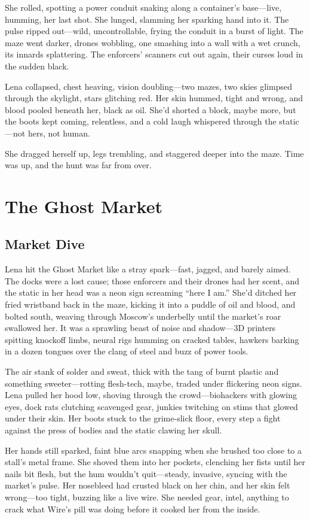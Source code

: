 \documentclass[12pt]{book}
\begin{document}
She rolled, spotting a power conduit snaking along a container’s base---live, humming, her last shot. She lunged, slamming her sparking hand into it. The pulse ripped out---wild, uncontrollable, frying the conduit in a burst of light. The maze went darker, drones wobbling, one smashing into a wall with a wet crunch, its innards splattering. The enforcers’ scanners cut out again, their curses loud in the sudden black.

Lena collapsed, chest heaving, vision doubling---two mazes, two skies glimpsed through the skylight, stars glitching red. Her skin hummed, tight and wrong, and blood pooled beneath her, black as oil. She’d shorted a block, maybe more, but the boots kept coming, relentless, and a cold laugh whispered through the static---not hers, not human.

She dragged herself up, legs trembling, and staggered deeper into the maze. Time was up, and the hunt was far from over.

\chapter{The Ghost Market}
\section{Market Dive}

Lena hit the Ghost Market like a stray spark---fast, jagged, and barely aimed. The docks were a lost cause; those enforcers and their drones had her scent, and the static in her head was a neon sign screaming ``here I am.'' She’d ditched her fried wristband back in the maze, kicking it into a puddle of oil and blood, and bolted south, weaving through Moscow’s underbelly until the market’s roar swallowed her. It was a sprawling beast of noise and shadow---3D printers spitting knockoff limbs, neural rigs humming on cracked tables, hawkers barking in a dozen tongues over the clang of steel and buzz of power tools.

The air stank of solder and sweat, thick with the tang of burnt plastic and something sweeter---rotting flesh-tech, maybe, traded under flickering neon signs. Lena pulled her hood low, shoving through the crowd---biohackers with glowing eyes, dock rats clutching scavenged gear, junkies twitching on stims that glowed under their skin. Her boots stuck to the grime-slick floor, every step a fight against the press of bodies and the static clawing her skull.

Her hands still sparked, faint blue arcs snapping when she brushed too close to a stall’s metal frame. She shoved them into her pockets, clenching her fists until her nails bit flesh, but the hum wouldn’t quit---steady, invasive, syncing with the market’s pulse. Her nosebleed had crusted black on her chin, and her skin felt wrong---too tight, buzzing like a live wire. She needed gear, intel, anything to crack what Wire’s pill was doing before it cooked her from the inside.
\end{document}
